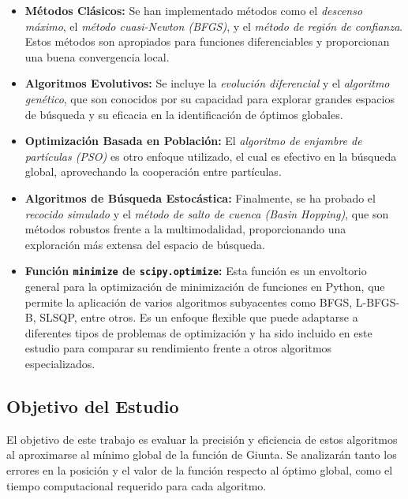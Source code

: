 \documentclass[fontsize=10pt]{article}
\begin{document}
\begin{itemize}
    \item \textbf{Métodos Clásicos:} Se han 
    implementado métodos como el 
    \textit{descenso máximo}, el \textit{método 
    cuasi-Newton (BFGS)}, y el \textit{método de 
    región de confianza}. Estos métodos son apropiados 
    para funciones diferenciables y proporcionan una 
    buena convergencia local.
    \item \textbf{Algoritmos Evolutivos:} Se incluye 
    la \textit{evolución diferencial} y el 
    \textit{algoritmo genético}, que son conocidos 
    por su capacidad para explorar grandes espacios 
    de búsqueda y su eficacia en la identificación 
    de óptimos globales.
    \item \textbf{Optimización Basada en Población:} 
    El \textit{algoritmo de enjambre de partículas 
    (PSO)} es otro enfoque utilizado, el cual es 
    efectivo en la búsqueda global, aprovechando la 
    cooperación entre partículas.
    \item \textbf{Algoritmos de Búsqueda Estocástica:} 
    Finalmente, se ha probado el \textit{recocido 
    simulado} y el \textit{método de salto de cuenca 
    (Basin Hopping)}, que son métodos robustos 
    frente a la multimodalidad, proporcionando una 
    exploración más extensa del espacio de búsqueda.
    \item \textbf{Función \texttt{minimize} de \texttt{scipy.optimize}:} 
    Esta función es un envoltorio general para la 
    optimización de minimización de funciones en 
    Python, que permite la aplicación de varios 
    algoritmos subyacentes como BFGS, L-BFGS-B, 
    SLSQP, entre otros. Es un enfoque flexible que 
    puede adaptarse a diferentes tipos de problemas 
    de optimización y ha sido incluido en este estudio 
    para comparar su rendimiento frente a otros 
    algoritmos especializados.
\end{itemize}

\subsection{Objetivo del Estudio}

El objetivo de este trabajo es evaluar la precisión y 
eficiencia de estos algoritmos al aproximarse al 
mínimo global de la función de Giunta. Se analizarán 
tanto los errores en la posición y el valor de la 
función respecto al óptimo global, como el tiempo 
computacional requerido para cada algoritmo.
\end{document}
